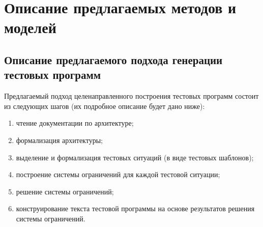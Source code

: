 \chapter{Описание предлагаемых методов и моделей}

\section{Описание предлагаемого подхода генерации тестовых программ}\label{sec:approach}
Предлагаемый подход целенаправленного построения тестовых программ состоит из следующих шагов (их подробное описание будет дано ниже):
\begin{enumerate}
    \item чтение документации по архитектуре;
    \item формализация архитектуры;
    \item выделение и формализация тестовых ситуаций (в виде тестовых шаблонов);
    \item построение системы ограничений для каждой тестовой ситуации;
    \item решение системы ограничений;
    \item конструирование текста тестовой программы на основе результатов решения системы ограничений.
\end{enumerate}

